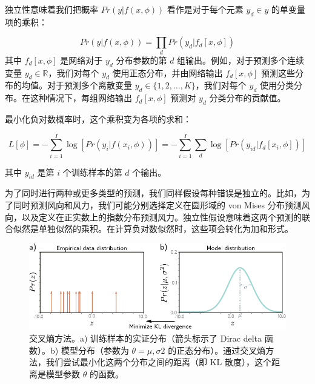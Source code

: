 \documentclass[lang=cn,newtx,10pt,scheme=chinese]{elegantbook}
\begin{document}
独立性意味着我们把概率 \(Pr(y|f(x, \phi))\) 看作是对于每个元素 \(y_d \in y\) 的单变量项的乘积：

\begin{equation}
Pr(y|f(x, \phi)) = \prod_{d} Pr(y_d|f_d[x, \phi]) 
\end{equation}
其中 \(f_d[x, \phi]\) 是网络对于 \(y_d\) 分布参数的第 \(d\) 组输出。例如，对于预测多个连续变量 \(y_d \in \mathbb{R}\)，我们对每个 \(y_d\) 使用正态分布，并由网络输出 \(f_d[x, \phi]\) 预测这些分布的均值。对于预测多个离散变量 \(y_d \in \{1, 2, \ldots, K\}\)，我们对每个 \(y_d\) 使用分类分布。在这种情况下，每组网络输出 \(f_d[x, \phi]\) 预测对 \(y_d\) 分类分布的贡献值。

最小化负对数概率时，这个乘积变为各项的求和：

\begin{equation}
L[\phi] = -\sum_{i=1}^{I} \log [Pr(y_i|f(x_i, \phi))] = -\sum_{i=1}^{I} \sum_{d} \log [Pr(y_{id}|f_d[x_i, \phi])] 
\end{equation}

其中 \(y_{id}\) 是第 \(i\) 个训练样本的第 \(d\) 个输出。

为了同时进行两种或更多类型的预测，我们同样假设每种错误是独立的。比如，为了同时预测风向和风力，我们可能分别选择定义在圆形域的 von Mises 分布预测风向，以及定义在正实数上的指数分布预测风力。独立性假设意味着这两个预测的联合似然是单独似然的乘积。在计算负对数似然时，这些项会转化为加和形式。



\begin{figure}[ht!]
	\centering
	\includegraphics[width=0.7\linewidth]{PDFFigures/UDLChap5PDF/LossCrossEntropy.pdf}
	\caption{交叉熵方法。a) 训练样本的实证分布（箭头标示了 Dirac delta 函数）。b) 模型分布（参数为 \(\theta = \mu, \sigma2\) 的正态分布）。通过交叉熵方法，我们尝试最小化这两个分布之间的距离（即 KL 散度），这个距离是模型参数 \(\theta\) 的函数。}
\end{figure}
\end{document}
